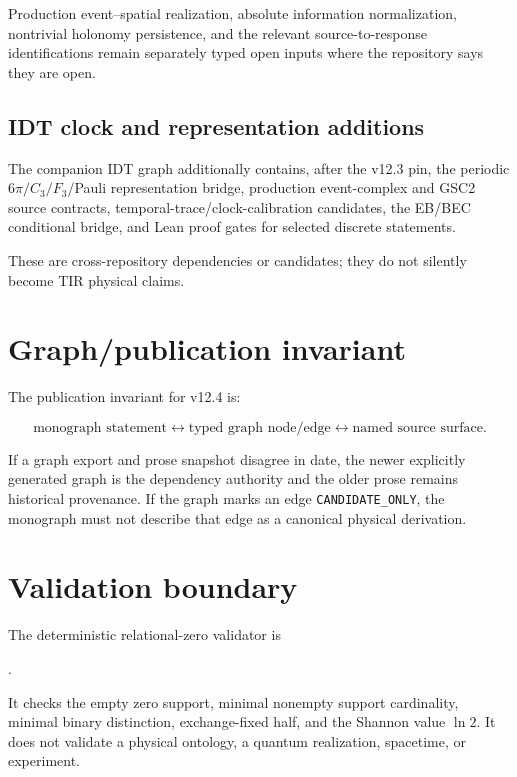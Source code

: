 Production event--spatial realization, absolute information normalization, nontrivial
holonomy persistence, and the relevant source-to-response identifications remain separately
typed open inputs where the repository says they are open.

\subsection{IDT clock and representation additions}

The companion IDT graph additionally contains, after the v12.3 pin, the periodic
$6\pi/C_3/F_3$/Pauli representation bridge, production event-complex and GSC2 source
contracts, temporal-trace/clock-calibration candidates, the EB/BEC conditional bridge,
and Lean proof gates for selected discrete statements.

These are cross-repository dependencies or candidates; they do not silently become TIR
physical claims.

\section{Graph/publication invariant}

The publication invariant for v12.4 is:

\[
\boxed{
\text{monograph statement}
\longleftrightarrow
\text{typed graph node/edge}
\longleftrightarrow
\text{named source surface}.
}
\]

If a graph export and prose snapshot disagree in date, the newer explicitly generated graph
is the dependency authority and the older prose remains historical provenance. If the graph
marks an edge \texttt{CANDIDATE\_ONLY}, the monograph must not describe that edge as a
canonical physical derivation.

\section{Validation boundary}

The deterministic relational-zero validator is

.

It checks the empty zero support, minimal nonempty support cardinality, minimal binary
distinction, exchange-fixed half, and the Shannon value $\ln2$. It does not validate a
physical ontology, a quantum realization, spacetime, or experiment.
